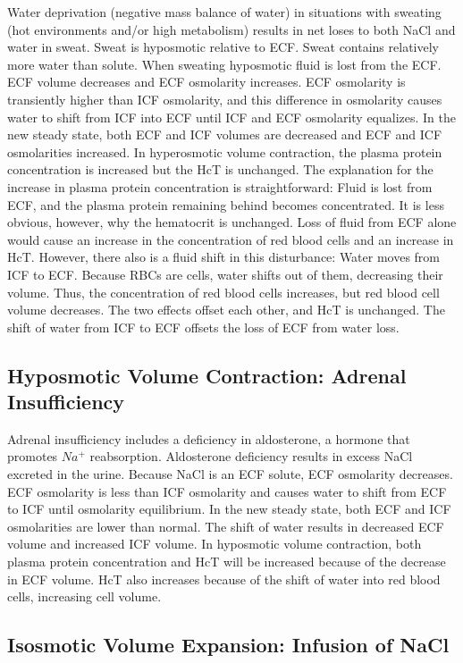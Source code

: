 Water deprivation (negative mass balance of water) in situations with sweating (hot environments and/or high metabolism) results in net loses to both NaCl and water in sweat. Sweat is hyposmotic relative to ECF. Sweat contains relatively more water than solute. When sweating hyposmotic fluid is lost from the ECF. ECF volume decreases and ECF osmolarity increases. ECF osmolarity is transiently higher than ICF osmolarity, and this difference in osmolarity causes water to shift from ICF into ECF until ICF and ECF osmolarity  equalizes. In the new steady state, both ECF and ICF volumes are decreased and ECF and ICF osmolarities increased. In hyperosmotic volume contraction, the plasma protein concentration is increased but the HcT is unchanged. The explanation for the increase in plasma protein concentration is straightforward: Fluid is lost from ECF, and the plasma protein remaining behind becomes concentrated. It is less obvious, however, why the hematocrit is unchanged. Loss of fluid from ECF alone would cause an increase in the concentration of red blood cells and an increase in HcT. However, there also is a fluid shift in this disturbance: Water moves from ICF to ECF. Because RBCs are cells, water shifts out of them, decreasing their volume. Thus, the concentration of red blood cells increases, but red blood cell volume decreases. The two effects offset each other, and HcT is unchanged. The shift of water from ICF to ECF offsets the loss of ECF from water loss.

\subsection{Hyposmotic Volume Contraction: Adrenal Insufficiency}

Adrenal insufficiency includes a deficiency in aldosterone, a hormone that promotes $Na^+$ reabsorption. Aldosterone deficiency results in excess NaCl excreted in the urine. Because NaCl is an ECF solute, ECF osmolarity decreases. ECF osmolarity is less than ICF osmolarity and causes water to shift from ECF to ICF until osmolarity equilibrium. In the new steady state, both ECF and ICF osmolarities are lower than normal. The shift of water results in decreased ECF volume and increased ICF volume. In hyposmotic volume contraction, both plasma protein concentration and HcT will be increased because of the decrease in ECF volume. HcT also increases because of the shift of water into red blood cells, increasing cell volume. 

\subsection{Isosmotic Volume Expansion: Infusion of NaCl} 


